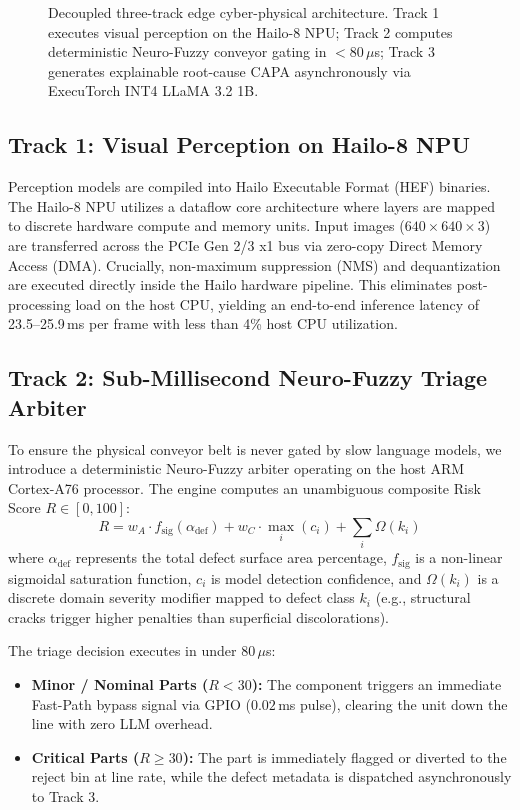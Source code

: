 \documentclass[conference]{IEEEtran}
\begin{document}
\begin{figure}[t]
\begin{tikzpicture}
\end{tikzpicture}
\caption{Decoupled three-track edge cyber-physical architecture. Track 1 executes visual perception on the Hailo-8 NPU; Track 2 computes deterministic Neuro-Fuzzy conveyor gating in $<80\,\mu$s; Track 3 generates explainable root-cause CAPA asynchronously via ExecuTorch INT4 LLaMA 3.2 1B.}
\label{fig:arch_diagram}
\end{figure}

\subsection{Track 1: Visual Perception on Hailo-8 NPU}
Perception models are compiled into Hailo Executable Format (HEF) binaries. The Hailo-8 NPU utilizes a dataflow core architecture where layers are mapped to discrete hardware compute and memory units. Input images ($640\times 640\times 3$) are transferred across the PCIe Gen 2/3 x1 bus via zero-copy Direct Memory Access (DMA). Crucially, non-maximum suppression (NMS) and dequantization are executed directly inside the Hailo hardware pipeline. This eliminates post-processing load on the host CPU, yielding an end-to-end inference latency of 23.5--25.9\,ms per frame with less than 4\% host CPU utilization.

\subsection{Track 2: Sub-Millisecond Neuro-Fuzzy Triage Arbiter}
To ensure the physical conveyor belt is never gated by slow language models, we introduce a deterministic Neuro-Fuzzy arbiter operating on the host ARM Cortex-A76 processor. The engine computes an unambiguous composite Risk Score $R \in [0, 100]$:
\begin{equation}
R = w_A \cdot f_{\text{sig}}(\alpha_{\text{def}}) + w_C \cdot \max_{i} (c_i) + \sum_{i} \Omega(k_i)
\end{equation}
where $\alpha_{\text{def}}$ represents the total defect surface area percentage, $f_{\text{sig}}$ is a non-linear sigmoidal saturation function, $c_i$ is model detection confidence, and $\Omega(k_i)$ is a discrete domain severity modifier mapped to defect class $k_i$ (e.g., structural cracks trigger higher penalties than superficial discolorations). 

The triage decision executes in under $80\,\mu$s:
\begin{itemize}
    \item \textbf{Minor / Nominal Parts ($R < 30$):} The component triggers an immediate Fast-Path bypass signal via GPIO ($0.02$\,ms pulse), clearing the unit down the line with zero LLM overhead.
    \item \textbf{Critical Parts ($R \ge 30$):} The part is immediately flagged or diverted to the reject bin at line rate, while the defect metadata is dispatched asynchronously to Track 3.
\end{itemize}
\end{document}
